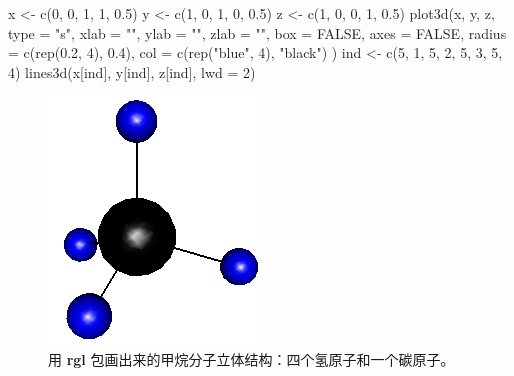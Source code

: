 \documentclass[
  b5paper,
  UTF8,twoside]{book}
\newenvironment{Shaded}{\begin{snugshade}}{\end{snugshade}}
\newcommand{\AttributeTok}[1]{\textcolor[rgb]{0.77,0.63,0.00}{#1}}
\newcommand{\ConstantTok}[1]{\textcolor[rgb]{0.00,0.00,0.00}{#1}}
\newcommand{\DecValTok}[1]{\textcolor[rgb]{0.00,0.00,0.81}{#1}}
\newcommand{\FloatTok}[1]{\textcolor[rgb]{0.00,0.00,0.81}{#1}}
\newcommand{\FunctionTok}[1]{\textcolor[rgb]{0.00,0.00,0.00}{#1}}
\newcommand{\NormalTok}[1]{#1}
\newcommand{\OtherTok}[1]{\textcolor[rgb]{0.56,0.35,0.01}{#1}}
\newcommand{\StringTok}[1]{\textcolor[rgb]{0.31,0.60,0.02}{#1}}
\begin{document}
\begin{Shaded}
\begin{Highlighting}[]
\NormalTok{x }\OtherTok{\textless{}{-}} \FunctionTok{c}\NormalTok{(}\DecValTok{0}\NormalTok{, }\DecValTok{0}\NormalTok{, }\DecValTok{1}\NormalTok{, }\DecValTok{1}\NormalTok{, }\FloatTok{0.5}\NormalTok{)}
\NormalTok{y }\OtherTok{\textless{}{-}} \FunctionTok{c}\NormalTok{(}\DecValTok{1}\NormalTok{, }\DecValTok{0}\NormalTok{, }\DecValTok{1}\NormalTok{, }\DecValTok{0}\NormalTok{, }\FloatTok{0.5}\NormalTok{)}
\NormalTok{z }\OtherTok{\textless{}{-}} \FunctionTok{c}\NormalTok{(}\DecValTok{1}\NormalTok{, }\DecValTok{0}\NormalTok{, }\DecValTok{0}\NormalTok{, }\DecValTok{1}\NormalTok{, }\FloatTok{0.5}\NormalTok{)}
\FunctionTok{plot3d}\NormalTok{(x, y, z,}
  \AttributeTok{type =} \StringTok{"s"}\NormalTok{, }\AttributeTok{xlab =} \StringTok{""}\NormalTok{, }\AttributeTok{ylab =} \StringTok{""}\NormalTok{, }\AttributeTok{zlab =} \StringTok{""}\NormalTok{,}
  \AttributeTok{box =} \ConstantTok{FALSE}\NormalTok{, }\AttributeTok{axes =} \ConstantTok{FALSE}\NormalTok{, }\AttributeTok{radius =} \FunctionTok{c}\NormalTok{(}\FunctionTok{rep}\NormalTok{(}\FloatTok{0.2}\NormalTok{, }\DecValTok{4}\NormalTok{), }\FloatTok{0.4}\NormalTok{),}
  \AttributeTok{col =} \FunctionTok{c}\NormalTok{(}\FunctionTok{rep}\NormalTok{(}\StringTok{"blue"}\NormalTok{, }\DecValTok{4}\NormalTok{), }\StringTok{"black"}\NormalTok{)}
\NormalTok{)}
\NormalTok{ind }\OtherTok{\textless{}{-}} \FunctionTok{c}\NormalTok{(}\DecValTok{5}\NormalTok{, }\DecValTok{1}\NormalTok{, }\DecValTok{5}\NormalTok{, }\DecValTok{2}\NormalTok{, }\DecValTok{5}\NormalTok{, }\DecValTok{3}\NormalTok{, }\DecValTok{5}\NormalTok{, }\DecValTok{4}\NormalTok{)}
\FunctionTok{lines3d}\NormalTok{(x[ind], y[ind], z[ind], }\AttributeTok{lwd =} \DecValTok{2}\NormalTok{)}
\end{Highlighting}
\end{Shaded}

\begin{figure}

{\centering \includegraphics{images/rgl-ch4} 

}

\caption[用 \textbf{rgl} 包画出来的甲烷分子立体结构]{用 \textbf{rgl} 包画出来的甲烷分子立体结构：四个氢原子和一个碳原子。}\label{fig:rgl-ch4}
\end{figure}
\end{document}
